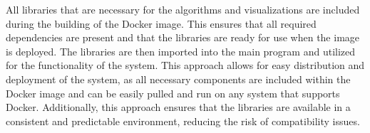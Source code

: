 All libraries that are necessary for the algorithms and visualizations are included during the building of the Docker image. This ensures that all required dependencies are present and that the libraries are ready for use when the image is deployed. The libraries are then imported into the main program and utilized for the functionality of the system. This approach allows for easy distribution and deployment of the system, as all necessary components are included within the Docker image and can be easily pulled and run on any system that supports Docker. Additionally, this approach ensures that the libraries are available in a consistent and predictable environment, reducing the risk of compatibility issues.
